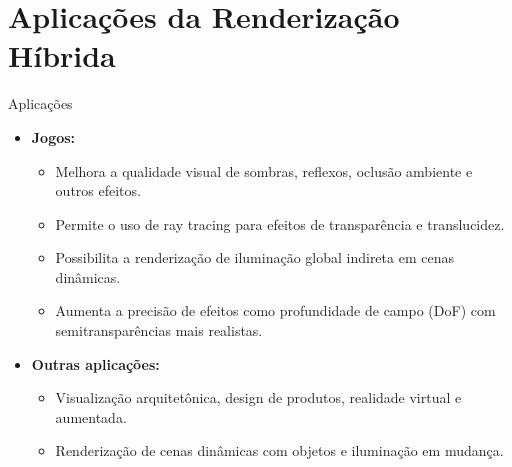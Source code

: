 \documentclass[aspectratio=169,xcolor=table]{beamer}
\begin{document}
\section{Aplicações da Renderização Híbrida}
\begin{frame}{Aplicações}
    \begin{itemize}
        \item \textbf{Jogos:}
        \begin{itemize}
            \item Melhora a qualidade visual de sombras, reflexos, oclusão ambiente e outros efeitos.
            \item Permite o uso de ray tracing para efeitos de transparência e translucidez.
            \item Possibilita a renderização de iluminação global indireta em cenas dinâmicas.
            \item Aumenta a precisão de efeitos como profundidade de campo (DoF) com semitransparências mais realistas.
        \end{itemize}
        \item \textbf{Outras aplicações:}
        \begin{itemize}
            \item Visualização arquitetônica, design de produtos, realidade virtual e aumentada.
            \item Renderização de cenas dinâmicas com objetos e iluminação em mudança.
        \end{itemize}
    \end{itemize}
\end{frame}

\end{document}
